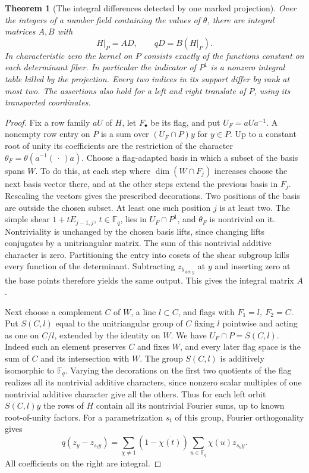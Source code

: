 \documentclass[a4paper,11pt]{article}
\newtheorem{theorem}[proposition]{Theorem}
\theoremstyle{definition}
\theoremstyle{remark}
\numberwithin{equation}{section}
\begin{document}
\begin{theorem}[The integral differences detected by one marked projection]
\leavevmode\label{thm:codimtwo624}
Over the integers of a number field containing the values of
\(\theta\), there are integral matrices \(A,B\) with
\[
               H|_P=A D,\qquad qD=B(H|_P).
\]
In characteristic zero the kernel on \(P\) consists exactly of
the functions constant on each determinant fiber. In particular
the indicator of \(P^1\) is a nonzero integral table killed by
the projection. Every two indices in its support differ by rank
at most two. The assertions also hold for a left and right
translate of \(P\), using its transported coordinates.
\end{theorem}
\begin{proof}
Fix a row family \(aU\) of \(H\), let \(F_\bullet\) be its flag,
and put \(U_F=aUa^{-1}\). A nonempty row entry on \(P\) is a
sum over \((U_F\cap P)y\) for \(y\in P\). Up to a constant root
of unity its coefficients are the restriction of the character
\(\theta_F=\theta(a^{-1}(\,\cdot\,)a)\). Choose a flag-adapted
basis in which a subset of the basis spans \(W\). To do this,
at each step where \(\dim(W\cap F_j)\) increases choose the
next basis vector there, and at the other steps extend the
previous basis in \(F_j\). Rescaling the vectors gives the
prescribed decorations. Two positions of the basis are outside
the chosen subset. At least one such position \(j\) is at least
two. The simple shear \(1+tE_{j-1,j}\), \(t\in\mathbb F_q\),
lies in \(U_F\cap P^1\), and \(\theta_F\) is nontrivial on it.
Nontriviality is unchanged by the chosen basis lifts, since
changing lifts conjugates by a unitriangular matrix. The sum
of this nontrivial additive character is zero. Partitioning
the entry into cosets of the shear subgroup kills every function
of the determinant. Subtracting \(z_{b_{\det y}}\) at \(y\)
and inserting zero at the base points therefore yields the
same output. This gives the integral matrix \(A\).

Next choose a complement \(C\) of \(W\), a line \(l\subset C\),
and flags with \(F_1=l,\ F_2=C\). Put \(S(C,l)\) equal to the
unitriangular group of \(C\) fixing \(l\) pointwise and acting
as one on \(C/l\), extended by the identity on \(W\). We have
\(U_F\cap P=S(C,l)\). Indeed such an element preserves \(C\)
and fixes \(W\), and every later flag space is the sum of \(C\)
and its intersection with \(W\). The group \(S(C,l)\) is
additively isomorphic to \(\mathbb F_q\). Varying the decorations
on the first two quotients of the flag realizes all its nontrivial
additive characters, since nonzero scalar multiples of one
nontrivial additive character give all the others. Thus for each
left orbit \(S(C,l)y\) the rows of \(H\) contain all its nontrivial
Fourier sums, up to known root-of-unity factors. For a parametrization
\(s_t\) of this group, Fourier orthogonality gives
\[
 q(z_y-z_{s_t y})=
   \sum_{\chi\ne1}(1-\overline{\chi(t)})
                     \sum_{u\in\mathbb F_q}\chi(u)z_{s_u y}.
\]
All coefficients on the right are integral.


\end{proof}
\end{document}
